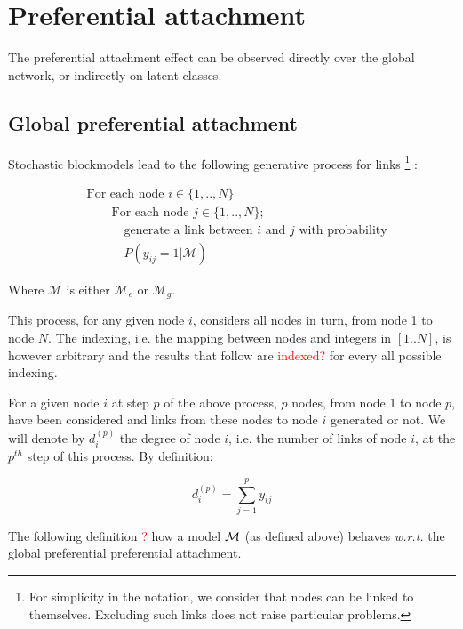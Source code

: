 \section{Preferential attachment}
\label{sec:burstiness}

The preferential attachment effect can be observed directly over the global network, or indirectly on latent classes.

\subsection{Global preferential attachment}

Stochastic blockmodels lead to the following generative process for links \footnote{For simplicity in the notation, we consider that nodes can be linked to themselves. Excluding such links does not raise particular problems.} :

\begin{align*}
    &\textrm{For each node } i \in \{1, .., N\}  \\
    &\qquad\textrm{For each node } j \in \{1, .., N\}; \\
    &\quad \qquad\textrm{generate a link between } i \textrm{ and } j \textrm{ with probability} \\
    &\quad \qquad P(y_{ij}=1 | \mathcal{M})
\end{align*}

Where $\mathcal{M}$ is either $\mathcal{M}_e$ or $\mathcal{M}_g$.

This process, for any given node $i$, considers all nodes in turn, from node 1 to node $N$. The indexing, i.e. the mapping between nodes and integers in $[1..N]$, is however arbitrary and the results that follow are \textcolor{red}{indexed?} for every all possible indexing.

For a given node $i$ at step $p$ of the above process, $p$ nodes, from node 1 to node $p$, have been considered and links from these nodes to node $i$ generated or not. We will denote by $d_i^{(p)}$ the degree of node $i$, i.e. the number of links of node $i$, at the $p^{th}$ step of this process. By definition:

\begin{equation} \label{eq:degree_def}
d_i^{(p)} = \sum_{j=1}^p y_{ij}
\end{equation}

The following definition \textcolor{red}{?} how a model $\mathcal{M}$ (as defined above) behaves \textit{w.r.t.} the global preferential preferential attachment.


